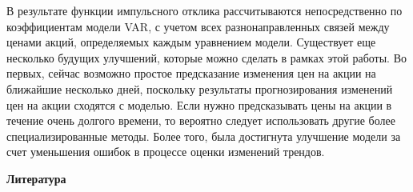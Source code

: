 \begin{multicols}{2}
В результате функции импульсного отклика рассчитываются непосредственно
по коэффициентам модели VAR, с учетом всех разнонаправленных связей
между ценами акций, определяемых каждым уравнением модели. Существует
еще несколько будущих улучшений, которые можно сделать в рамках этой
работы. Во первых, сейчас возможно простое предсказание изменения цен на
акции на ближайшие несколько дней, поскольку результаты прогнозирования
изменений цен на акции сходятся с моделью. Если нужно предсказывать цены
на акции в течение очень долгого времени, то вероятно следует
использовать другие более специализированные методы. Более того, была
достигнута улучшение модели за счет уменьшения ошибок в процессе оценки
изменений трендов.
\end{multicols}

\begin{center}
{\bfseries Литература}
\end{center}

